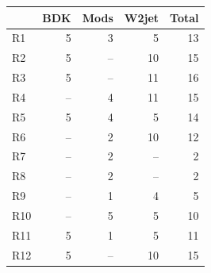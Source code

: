 \begin{tabular}{@{}lrrrr@{}}
  \toprule
  & BDK & Mods & W2jet & Total \\
  \midrule
    R1 & 5 & 3 & 5 & 13 \\
    R2 & 5 & -- & 10 & 15 \\
    R3 & 5 & -- & 11 & 16 \\
    R4 & -- & 4 & 11 & 15 \\
    R5 & 5 & 4 & 5 & 14 \\
    R6 & -- & 2 & 10 & 12 \\
    R7 & -- & 2 & -- & 2 \\
    R8 & -- & 2 & -- & 2 \\
    R9 & -- & 1 & 4 & 5 \\
    R10 & -- & 5 & 5 & 10 \\
    R11 & 5 & 1 & 5 & 11 \\
    R12 & 5 & -- & 10 & 15 \\
  \bottomrule
\end{tabular}

